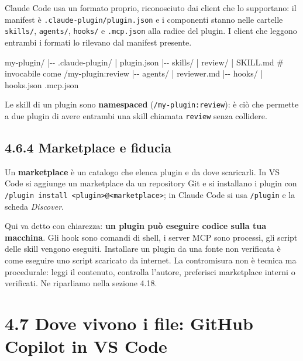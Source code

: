 \documentclass[
  italian,
  10pt,
]{book}
\newenvironment{Shaded}{\begin{snugshade}}{\end{snugshade}}
\newcommand{\NormalTok}[1]{#1}
\begin{document}
Claude Code usa un formato proprio, riconosciuto dai client che lo
supportano: il manifest è \texttt{.claude-plugin/plugin.json} e i
componenti stanno nelle cartelle \texttt{skills/}, \texttt{agents/},
\texttt{hooks/} e \texttt{.mcp.json} alla radice del plugin. I client
che leggono entrambi i formati lo rilevano dal manifest presente.

\begin{Shaded}
\begin{Highlighting}[]
\NormalTok{my{-}plugin/}
\NormalTok{|{-}{-} .claude{-}plugin/}
\NormalTok{|   \textasciigrave{}{-}{-} plugin.json}
\NormalTok{|{-}{-} skills/}
\NormalTok{|   \textasciigrave{}{-}{-} review/}
\NormalTok{|       \textasciigrave{}{-}{-} SKILL.md          \# invocabile come /my{-}plugin:review}
\NormalTok{|{-}{-} agents/}
\NormalTok{|   \textasciigrave{}{-}{-} reviewer.md}
\NormalTok{|{-}{-} hooks/}
\NormalTok{|   \textasciigrave{}{-}{-} hooks.json}
\NormalTok{\textasciigrave{}{-}{-} .mcp.json}
\end{Highlighting}
\end{Shaded}

Le skill di un plugin sono \textbf{namespaced}
(\texttt{/my-plugin:review}): è ciò che permette a due plugin di avere
entrambi una skill chiamata \texttt{review} senza collidere.

\subsection{4.6.4 Marketplace e fiducia}\label{marketplace-e-fiducia}

Un \textbf{marketplace} è un catalogo che elenca plugin e da dove
scaricarli. In VS Code si aggiunge un marketplace da un repository Git e
si installano i plugin con
\texttt{/plugin\ install\ \textless{}plugin\textgreater{}@\textless{}marketplace\textgreater{}};
in Claude Code si usa \texttt{/plugin} e la scheda \emph{Discover}.

Qui va detto con chiarezza: \textbf{un plugin può eseguire codice sulla
tua macchina}. Gli hook sono comandi di shell, i server MCP sono
processi, gli script delle skill vengono eseguiti. Installare un plugin
da una fonte non verificata è come eseguire uno script scaricato da
internet. La contromisura non è tecnica ma procedurale: leggi il
contenuto, controlla l'autore, preferisci marketplace interni o
verificati. Ne riparliamo nella sezione 4.18.

\newpage

\section{4.7 Dove vivono i file: GitHub Copilot in VS
Code}\label{dove-vivono-i-file-github-copilot-in-vs-code}
\end{document}
